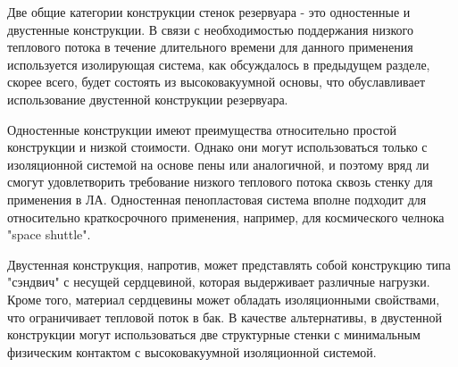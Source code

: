 Две общие категории конструкции стенок резервуара - это одностенные и двустенные конструкции. В связи с необходимостью поддержания низкого теплового потока в течение длительного времени для данного применения используется изолирующая система, как обсуждалось в предыдущем разделе, скорее всего, будет состоять из высоковакуумной основы, что обуславливает использование двустенной конструкции резервуара.

Одностенные конструкции имеют преимущества относительно простой конструкции и низкой стоимости. Однако они могут использоваться только с изоляционной системой на основе пены или аналогичной, и поэтому вряд ли смогут удовлетворить требование низкого теплового потока сквозь стенку для применения в ЛА. Одностенная пенопластовая система вполне подходит для относительно краткосрочного применения, например, для космического челнока "space shuttle".

Двустенная конструкция, напротив, может представлять собой конструкцию типа "сэндвич" с несущей сердцевиной, которая выдерживает различные нагрузки. Кроме того, материал сердцевины может обладать изоляционными свойствами, что ограничивает тепловой поток в бак. В качестве альтернативы, в двустенной конструкции могут использоваться две структурные стенки с минимальным физическим контактом с высоковакуумной изоляционной системой.


